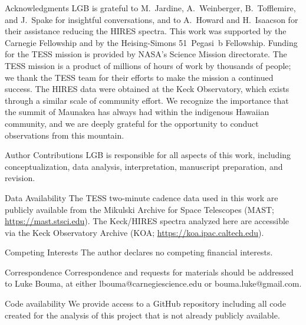 \documentclass{nature3}
\begin{document}
\begin{addendum}

\item[Acknowledgments]
  LGB is grateful to M.~Jardine, A.~Weinberger, B.~Tofflemire, and
  J.~Spake for
  insightful conversations, and to A.~Howard and H.~Isaacson for their
  assistance reducing the HIRES spectra.
  This work was supported by the Carnegie Fellowship and by the
  Heising-Simons 51~Pegasi~b Fellowship.
  Funding for the TESS mission is provided by NASA’s Science Mission
  directorate.
  The TESS mission is a product of millions of hours of work by
  thousands of people; we thank the TESS team for their efforts to
  make the mission a continued success.
  The HIRES data were obtained at the Keck Observatory, which exists
  through a similar scale of community effort.
  We recognize the importance that the summit of Maunakea has always had
  within the indigenous Hawaiian community, and we are deeply grateful 
  for the opportunity to conduct observations from this mountain.

\item[Author Contributions] LGB is responsible for all aspects of this
  work, including conceptualization, data analysis, interpretation,
  manuscript preparation, and revision.

\item[Data Availability] The TESS two-minute cadence data used in this
  work are publicly available from the Mikulski Archive for Space
  Telescopes (MAST; \url{https://mast.stsci.edu}). The Keck/HIRES
  spectra analyzed here are accessible via the Keck Observatory
  Archive (KOA; \url{https://koa.ipac.caltech.edu}).

\item[Competing Interests] The author declares no competing financial
  interests.
 
\item[Correspondence] Correspondence and requests for materials should
  be addressed to Luke Bouma, at either lbouma@carnegiescience.edu or
  bouma.luke@gmail.com.
 
\item[Code availability] We provide access to a GitHub repository
  including all code created for the analysis of this project that is
  not already publicly available.

\end{addendum}
\end{document}
